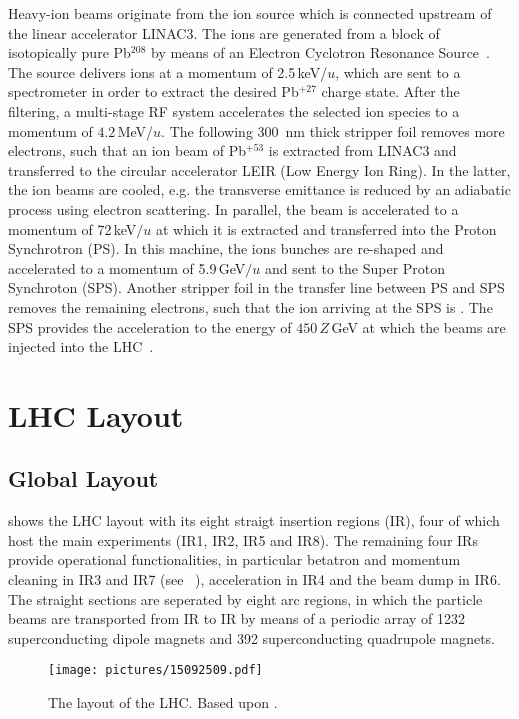 Heavy-ion beams originate from the ion source which is connected upstream of the linear accelerator LINAC3. The ions are generated from a block of isotopically pure Pb$^{208}$ by means of an Electron Cyclotron Resonance Source~\cite{CERN-2004-003-V1}. The source delivers ions at a momentum of 2.5\,keV/$u$, which are sent to a spectrometer in order to extract the desired Pb$^{+27}$ charge state. After the filtering, a multi-stage RF system accelerates the selected ion species to a momentum of $4.2\,$MeV/$u$. The following 300~nm thick stripper foil removes more electrons, such that an ion beam of Pb$^{+53}$ is extracted from LINAC3 and transferred to the circular accelerator LEIR (Low Energy Ion Ring). In the latter, the ion beams are cooled, e.g. the transverse emittance is reduced by an adiabatic process using electron scattering. In parallel, the beam is accelerated to a momentum of 72$\,$keV$/u$ at which it is extracted and transferred into the Proton Synchrotron (PS). In this machine, the ions bunches are re-shaped and accelerated to a momentum of 5.9$\,$GeV$/u$ and sent to the Super Proton Synchroton (SPS). Another stripper foil in the transfer line between PS and SPS removes the remaining electrons, such that the ion arriving at the SPS is \lead. The SPS provides the acceleration to the energy of $450\,Z\,$GeV at which the beams are injected into the LHC~\citedr.


\section{LHC Layout}
\subsection{Global Layout}
%
 shows the LHC layout with its eight straigt insertion regions (IR), four of which host the main experiments (IR1, IR2, IR5 and IR8). The remaining four IRs provide operational functionalities, in particular betatron and momentum cleaning in IR3 and IR7 (see ~), acceleration in IR4 and the beam dump in IR6. The straight sections are seperated by eight arc regions, in which the particle beams are transported from IR to IR by means of a periodic array of 1232 superconducting dipole magnets and 392 superconducting quadrupole magnets. 
%
%
\begin{figure}[b]
  \centering
  \texttt{[image: pictures/15092509.pdf]}
  \caption{The layout of the LHC. Based upon \cite{Bruning2012705,CERN-2004-003-V1}.}  
  \label{pic:15032201}
\end{figure}



